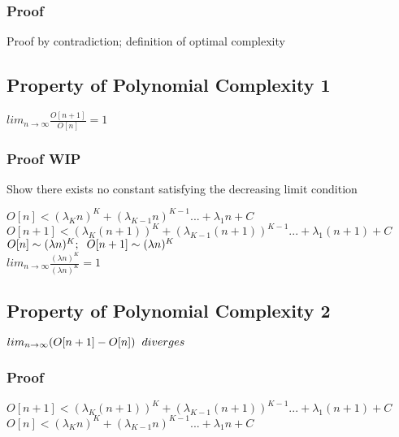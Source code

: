\documentclass[11pt]{article}
\begin{document}
\subsubsection{Proof}
Proof by contradiction; definition of optimal complexity









\subsection{Property of Polynomial  Complexity 1}
\begin{center}
$
lim_{n \rightarrow \infty} \frac{O[n+1]}{O[n]} = 1
$
\end{center}
\subsubsection{Proof WIP}
Show there exists no constant satisfying the decreasing limit condition
\begin{center}
$
O[n] < (\lambda_K n)^K + (\lambda_{K-1} n)^{K-1}... + \lambda_1 n + C
$
\\ \vspace{2mm}
$
O[n+1] < (\lambda_K (n+1))^K + (\lambda_{K-1} (n+1))^{K-1}... + \lambda_1 (n+1) + C
$
\\ \vspace{2mm}
$
O[n] \sim (\lambda n)^K; \hspace{2mm} O[n+1] \sim  (\lambda n)^K
$
\\ \vspace{2mm}
$
lim_{n \rightarrow \infty} \frac{(\lambda n)^K}{(\lambda n)^K} = 1
$
\end{center}







\subsection{Property of Polynomial Complexity 2}
\begin{center}
$
lim_{n \rightarrow \infty}( O[n+1] - O[n] ) \hspace{2mm} diverges
$
\end{center}
\subsubsection{Proof}
\begin{center}
$
O[n+1] < (\lambda_K (n+1))^K + (\lambda_{K-1} (n+1))^{K-1}... + \lambda_1 (n+1) + C
$
\\ \vspace{2mm}
$
O[n] < (\lambda_K n)^K + (\lambda_{K-1} n)^{K-1}... + \lambda_1 n + C
$

\end{center}
\end{document}
